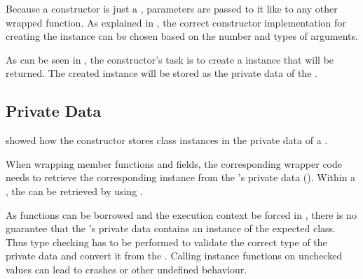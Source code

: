 Because a constructor is just a ,  parameters are passed to it like to any other wrapped function. As explained in , the correct constructor implementation for creating the  instance can be chosen based on the number and types of arguments.

As can be seen in , the constructor's task is to create a  instance that will be returned. The created  instance will be stored as the private data of the .

\subsection{Private Data}
\label{sec:PrivateData}

 showed how the constructor stores  class instances in the private data  of a .

When wrapping member functions and fields, the corresponding wrapper code needs to retrieve the corresponding  instance from the  's private data (). Within a , the   can be retrieved by using .

As functions can be borrowed and the execution context be forced in , there is no guarantee that the 's private data contains an instance of the expected class. Thus type checking has to be performed to validate the correct type of the private data and convert it from the . Calling instance functions on unchecked values can lead to crashes or other undefined behaviour.


